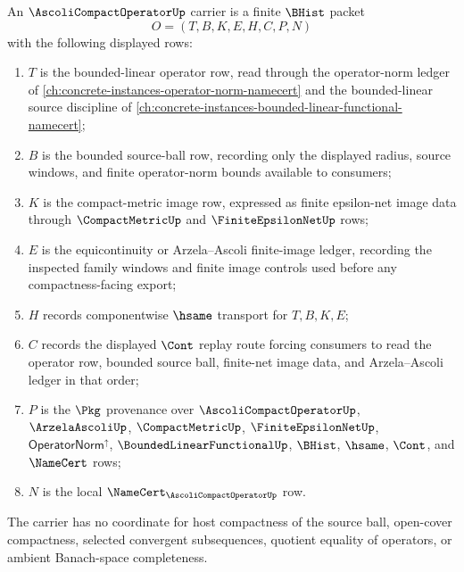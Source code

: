 \begin{definition}
\label{def:ascoli-compact-operator-carrier}
An $\AscoliCompactOperatorUp$ carrier is a finite $\BHist$ packet
$$
O=(T,B,K,E,H,C,P,N)
$$
with the following displayed rows:
\begin{enumerate}
\item $T$ is the bounded-linear operator row, read through the operator-norm ledger of \autoref{ch:concrete-instances-operator-norm-namecert} and the bounded-linear source discipline of \autoref{ch:concrete-instances-bounded-linear-functional-namecert};
\item $B$ is the bounded source-ball row, recording only the displayed radius, source windows, and finite operator-norm bounds available to consumers;
\item $K$ is the compact-metric image row, expressed as finite epsilon-net image data through $\CompactMetricUp$ and $\FiniteEpsilonNetUp$ rows;
\item $E$ is the equicontinuity or Arzela--Ascoli finite-image ledger, recording the inspected family windows and finite image controls used before any compactness-facing export;
\item $H$ records componentwise $\hsame$ transport for $T,B,K,E$;
\item $C$ records the displayed $\Cont$ replay route forcing consumers to read the operator row, bounded source ball, finite-net image data, and Arzela--Ascoli ledger in that order;
\item $P$ is the $\Pkg$ provenance over $\AscoliCompactOperatorUp$, $\ArzelaAscoliUp$, $\CompactMetricUp$, $\FiniteEpsilonNetUp$, $\mathsf{OperatorNorm}^{\uparrow}$, $\BoundedLinearFunctionalUp$, $\BHist$, $\hsame$, $\Cont$, and $\NameCert$ rows;
\item $N$ is the local $\NameCert_{\AscoliCompactOperatorUp}$ row.
\end{enumerate}
The carrier has no coordinate for host compactness of the source ball, open-cover compactness, selected convergent subsequences, quotient equality of operators, or ambient Banach-space completeness.
\end{definition}

